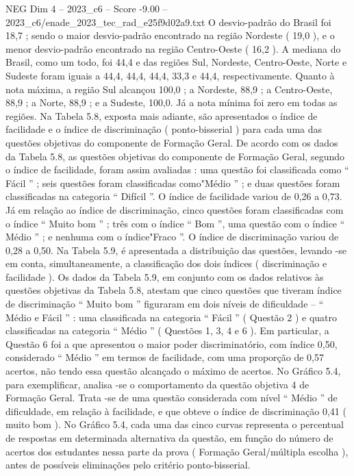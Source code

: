 \begin{textsample}{NEG Dim 4 – 2023\_c6 – Score -9.00 – 2023\_c6/enade\_2023\_tec\_rad\_e25f9d02a9.txt}
O desvio-padrão do Brasil foi 18,7 ; sendo o maior desvio-padrão encontrado na região Nordeste ( 19,0 ), e o menor desvio-padrão encontrado na região Centro-Oeste ( 16,2 ).
A mediana do Brasil, como um todo, foi 44,4 e das regiões Sul, Nordeste, Centro-Oeste, Norte e Sudeste foram iguais a 44,4, 44,4, 44,4, 33,3 e 44,4, respectivamente.
Quanto à nota máxima, a região Sul alcançou 100,0 ; a Nordeste, 88,9 ; a Centro-Oeste, 88,9 ; a Norte, 88,9 ; e a Sudeste, 100,0.
Já a nota mínima foi zero em todas as regiões.
Na Tabela 5.8, exposta mais adiante, são apresentados o índice de facilidade e o índice de discriminação ( ponto-bisserial ) para cada uma das questões objetivas do componente de Formação Geral.
De acordo com os dados da Tabela 5.8, as questões objetivas do componente de Formação Geral, segundo o índice de facilidade, foram assim avaliadas : uma questão foi classificada como “ Fácil ” ; seis questões foram classificadas como"Médio ” ; e duas questões foram classificadas na categoria “ Difícil ”.
O índice de facilidade variou de 0,26 a 0,73.
Já em relação ao índice de discriminação, cinco questões foram classificadas com o índice “ Muito bom ” ; três com o índice “ Bom ”, uma questão com o índice “ Médio ” ; e nenhuma com o índice"Fraco ”.
O índice de discriminação variou de 0,28 a 0,50.
Na Tabela 5.9, é apresentada a distribuição das questões, levando -se em conta, simultaneamente, a classificação dos dois índices ( discriminação e facilidade ).
Os dados da Tabela 5.9, em conjunto com os dados relativos às questões objetivas da Tabela 5.8, atestam que cinco questões que tiveram índice de discriminação “ Muito bom ” figuraram em dois níveis de dificuldade – “ Médio e Fácil ” : uma classificada na categoria “ Fácil ” ( Questão 2 ) e quatro classificadas na categoria “ Médio ” ( Questões 1, 3, 4 e 6 ).
Em particular, a Questão 6 foi a que apresentou o maior poder discriminatório, com índice 0,50, considerado “ Médio ” em termos de facilidade, com uma proporção de 0,57 acertos, não tendo essa questão alcançado o máximo de acertos.
No Gráfico 5.4, para exemplificar, analisa -se o comportamento da questão objetiva 4 de Formação Geral.
Trata -se de uma questão considerada com nível “ Médio ” de dificuldade, em relação à facilidade, e que obteve o índice de discriminação 0,41 ( muito bom ).
No Gráfico 5.4, cada uma das cinco curvas representa o percentual de respostas em determinada alternativa da questão, em função do número de acertos dos estudantes nessa parte da prova ( Formação Geral/múltipla escolha ), antes de possíveis eliminações pelo critério ponto-bisserial.

\end{textsample}
